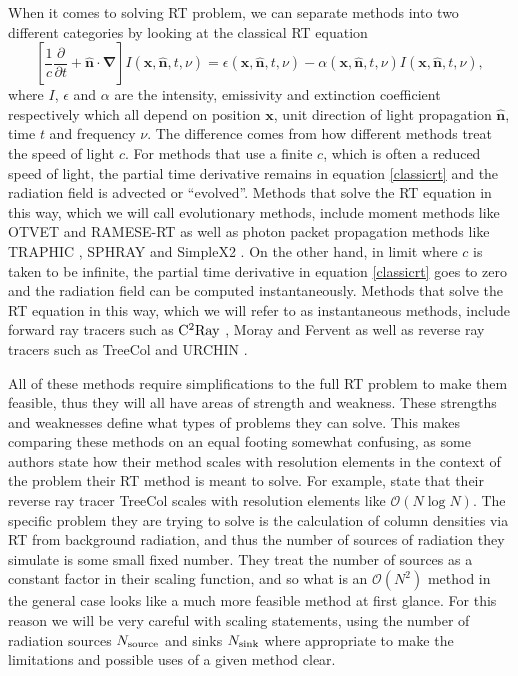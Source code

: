 \documentclass[fleqn,usenatbib]{mnras}
\begin{document}
When it comes to solving RT problem, we can separate methods into two different
categories by looking at the classical RT equation 
\citep{mihalasMihalas84}
\begin{equation} \label{classicrt}
\left[ \frac{1}{c} \frac{\partial}{\partial t} + \mathbf{\hat{n} \cdot \nabla}
 \right] I\left(\mathbf{x}, \mathbf{\hat{n}}, t, \nu\right) = 
\epsilon\left(\mathbf{x}, \mathbf{\hat{n}}, t, \nu\right) - 
\alpha\left(\mathbf{x}, \mathbf{\hat{n}}, t, \nu\right) 
I\left(\mathbf{x}, \mathbf{\hat{n}}, t, \nu\right),
\end{equation}
where $I$, $\epsilon$ and $\alpha$ are the intensity, emissivity and extinction
 coefficient respectively which all depend on position $\mathbf{x}$, 
unit direction of light propagation $\mathbf{\hat{n}}$, time $t$ and frequency 
$\nu$. The difference comes from how different methods treat the speed of 
light $c$. For methods that use a finite $c$, which is often a 
reduced speed of light, the partial time derivative remains in equation 
\ref{classicrt} and the radiation field is advected or ``evolved''. Methods 
that solve the RT equation in this way, which we will call evolutionary 
methods, include moment methods like OTVET \citep{gnedinAbel01} and  RAMESE-RT 
\citep{rosdahlTeyssier15} as well as photon packet propagation methods like 
TRAPHIC \citep{pawlikSchaye08}, SPHRAY \citep{altayEt08} and SimpleX2 
\citep{paardekooperEt10}. On the other hand, in limit where $c$ is taken to be 
infinite, the partial time derivative in equation \ref{classicrt} goes to zero 
and the radiation field can be computed instantaneously. Methods that solve the
 RT equation in this way, which we will refer to as instantaneous methods, 
include forward ray tracers such as $\rm C^2Ray$ \citep{mellemaEt06a}, Moray 
\citep{wiseAbel11} and Fervent \citep{baczynskiEt15} as well as reverse ray 
tracers such as TreeCol \citep{clarkEt12} and URCHIN \citep{altayTheuns13}.

All of these methods require simplifications to the full RT problem to make 
them feasible, thus they will all have areas of strength and weakness. These
strengths and weaknesses define what types of problems they can solve. This 
makes comparing these methods on an equal footing somewhat confusing, as some 
authors state how their method scales with resolution elements in the context 
of the problem their RT method is meant to solve. For example, \cite{clarkEt12}
 state that their reverse ray tracer TreeCol scales with resolution elements 
like $\mathcal{O}(N\log{N})$. The specific problem they are trying to solve is 
the calculation of column densities via RT from background radiation, and thus
the number of sources of radiation they simulate is some small fixed number. 
They treat the number of sources as a constant factor in their scaling 
function, and so what is an $\mathcal{O}(N^2)$ method in the general case 
looks like a much more feasible method at first glance. For this reason we will
be very careful with scaling statements, using the number of radiation sources 
$N_{\rm source}$ and sinks $N_{\rm sink}$ where appropriate to make the 
limitations and possible uses of a given method clear.
\end{document}
